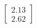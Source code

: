 \documentclass[preview]{standalone}
\begin{document}
\begin{align*}
\begin{bmatrix} 2.13 \\ 2.62 \end{bmatrix}
\end{align*}
\end{document}
